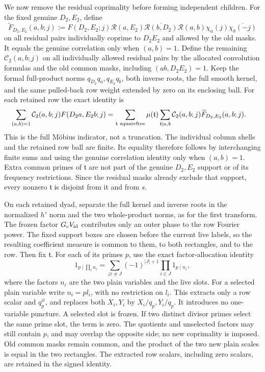 \documentclass[12pt]{article}
\begin{document}
We now remove the residual coprimality before forming independent
children.  For the fixed genuine \(D_2,E_2\), define
\[
 \widetilde F_{D_2,E_2}(a,b;j)
 :=F(D_2,E_2;j)\mathcal R(a,E_2)
   \overline{\mathcal R(b,D_2)}\mathcal R(a,b)
   \chi_a(j)\overline{\chi_b(-j)}
\]
on all residual pairs individually coprime to \(D_2E_2\) and allowed by
the old masks.  It equals the genuine correlation only when \((a,b)=1\).
Define the remaining
\(\mathcal C_2(a,b;j)\) on all individually allowed residual pairs
by the allocated convolution formulas and the old common masks,
including \((ab,D_2E_2)=1\).  Keep the formal full-product norms
\(q_{D_2}q_a,q_{E_2}q_b\), both inverse roots, the full smooth
kernel, and the same pulled-back row weight extended by zero on its
enclosing ball.  For each retained row the exact identity is
\[
 \begin{split}
 \sum_{(a,b)=1}\mathcal C_2(a,b;j)F(D_2a,E_2b;j)
 &=\sum_{\mathfrak t\ {\rm squarefree}}\mu(\mathfrak t)
   \sum_{\mathfrak t\mid a,b}\mathcal C_2(a,b;j)
                \widetilde F_{D_2,E_2}(a,b;j).
 \end{split}
\]
This is the full M\"obius indicator, not a truncation.  The individual
column shells and the retained row ball are finite.  Its equality
therefore follows by interchanging finite sums and using the genuine
correlation identity only when \((a,b)=1\).  Extra common primes of
\(\mathfrak t\) are not part of the genuine \(D_2,E_2\) support or
of its frequency restrictions.  Since the residual masks already
exclude that support, every nonzero \(\mathfrak t\) is disjoint from
it and from \(s\).

On each retained dyad, separate the full kernel and inverse roots in
the normalized \(h'\) norm and the two whole-product norms, as for the first transform.
The frozen factor \(G_cV_{\rm id}\) contributes only an outer phase
to the row Fourier power.  The fixed support boxes are chosen before
the current live labels, so the resulting coefficient measure is
common to them, to both rectangles, and to the row.  Then fix \(\mathfrak t\).  For each of its primes \(p\),
use the exact factor-allocation identity
\[
 1_{p\mid\prod_i n_i}
 =\sum_{\varnothing\ne J}(-1)^{|J|+1}
       \prod_{i\in J}1_{p\mid n_i},
\]
where the factors \(n_i\) are the two plain variables and the live
slots.  For a selected plain variable write \(n_i=pl_i\), with no
restriction on \(l_i\).  This extracts only a row scalar and
\(q_p^{it}\), and replaces both \(X_i,Y_i\) by
\(X_i/q_p,Y_i/q_p\).  It introduces no one-variable puncture.
A selected slot is frozen.  If two distinct divisor primes select
the same prime slot, the term is zero.  The quotients and unselected
factors may still contain \(p\), and may overlap the opposite side;
no new coprimality is imposed.  Old common masks remain common, and
the product of the two new plain scales is equal in the two rectangles.
The extracted row scalars, including zero scalars, are retained in
the signed identity.
\end{document}
